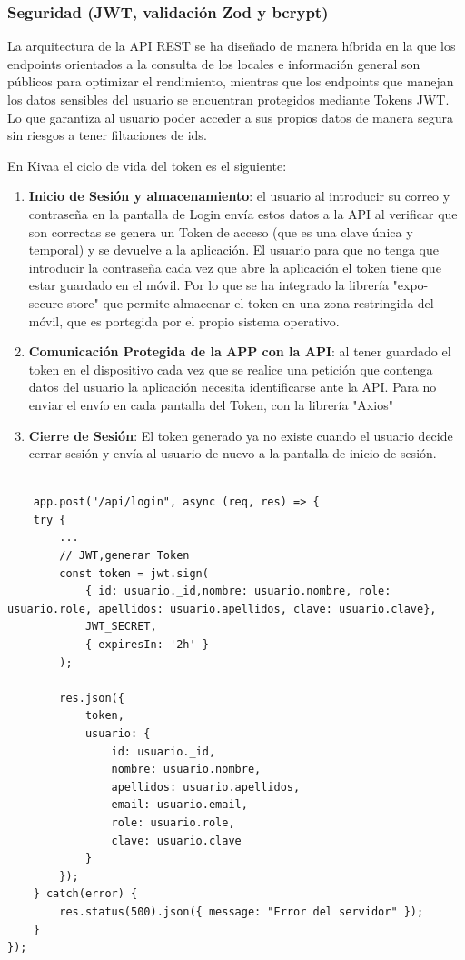 \documentclass[a4paper,11pt]{article}
\begin{document}
\subsubsection{Seguridad (JWT, validación Zod y bcrypt)}

La arquitectura de la API REST se ha diseñado de manera híbrida en la que los endpoints orientados a la consulta de los locales e información general son públicos para optimizar el rendimiento, mientras que los endpoints que manejan los datos sensibles del usuario se encuentran protegidos mediante Tokens JWT. Lo que garantiza al usuario poder acceder a sus propios datos de manera segura sin riesgos a tener filtaciones de ids.

En Kivaa el ciclo de vida del token es el siguiente: 
\begin{enumerate}
    \item \textbf{Inicio de Sesión y almacenamiento}: el usuario al introducir su correo y contraseña en la pantalla de Login envía estos datos a la API al verificar que son correctas se genera un Token de acceso (que es una clave única y temporal) y se devuelve a la aplicación. El usuario para que no tenga que introducir la contraseña cada vez que abre la aplicación el token tiene que estar guardado en el móvil. Por lo que se ha integrado la librería "expo-secure-store" que permite almacenar el token en una zona restringida del móvil, que es portegida por el propio sistema operativo.
    \item \textbf{Comunicación Protegida de la APP con la API}: al tener guardado el token en el dispositivo cada vez que se realice una petición que contenga datos del usuario la aplicación necesita identificarse ante la API. Para no enviar el envío en cada pantalla del Token, con la librería "Axios" 
    \item \textbf{Cierre de Sesión}: El token generado ya no existe cuando el usuario decide cerrar sesión y envía al usuario de nuevo a la pantalla de inicio de sesión. \cite{6}
\end{enumerate}

\vspace{0.5cm}

\begin{lstlisting}[style=javascript, caption={Generar Token al iniciar sesión el usuario.}]

    app.post("/api/login", async (req, res) => {
    try {
        ...
        // JWT,generar Token
        const token = jwt.sign(
            { id: usuario._id,nombre: usuario.nombre, role: usuario.role, apellidos: usuario.apellidos, clave: usuario.clave},
            JWT_SECRET,
            { expiresIn: '2h' }
        );

        res.json({
            token,
            usuario: {
                id: usuario._id,
                nombre: usuario.nombre,
                apellidos: usuario.apellidos,
                email: usuario.email,
                role: usuario.role,
                clave: usuario.clave
            }
        });
    } catch(error) {
        res.status(500).json({ message: "Error del servidor" });
    }
});
\end{lstlisting}
\end{document}
